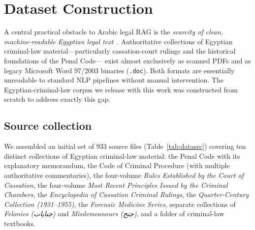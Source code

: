 \documentclass[final,1p,times]{elsarticle}
\newcommand{\ar}[1]{{\arabicfont\beginR #1\endR}}
\begin{document}
\section{Dataset Construction}\label{sec:dataset}

A central practical obstacle to Arabic legal RAG is the \emph{scarcity of
clean, machine-readable Egyptian legal text}~\cite{hrimech2025,aboasal2025}.
Authoritative collections of Egyptian criminal-law material---particularly
cassation-court rulings and the historical foundations of the Penal Code---
exist almost exclusively as scanned PDFs and as legacy Microsoft Word 97/2003
binaries (\texttt{.doc}). Both formats are essentially unreadable to standard
NLP pipelines without manual intervention. The Egyptian-criminal-law corpus
we release with this work was constructed from scratch to address exactly
this gap.

\subsection{Source collection}

We assembled an initial set of 933 source files (Table~\ref{tab:datasrc})
covering ten distinct collections of Egyptian criminal-law material:
the Penal Code with its explanatory memorandum, the Code of Criminal
Procedure (with multiple authoritative commentaries), the four-volume
\emph{Rules Established by the Court of Cassation}, the four-volume
\emph{Most Recent Principles Issued by the Criminal Chambers}, the
\emph{Encyclopedia of Cassation Criminal Rulings}, the \emph{Quarter-Century
Collection (1931--1955)}, the \emph{Forensic Medicine Series}, separate
collections of \emph{Felonies (\ar{جنايات})} and \emph{Misdemeanours
(\ar{جنح})}, and a folder of criminal-law textbooks.
\end{document}
